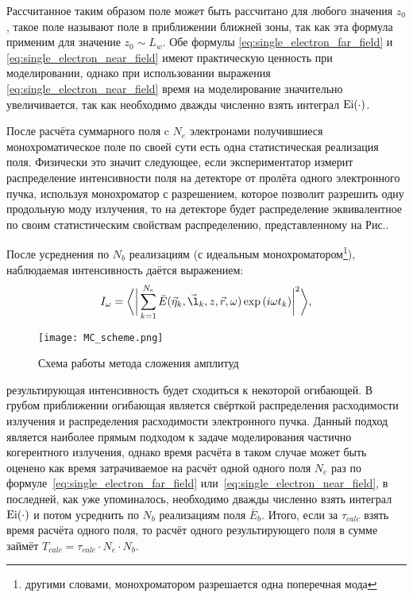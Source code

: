 Рассчитанное таким образом поле может быть рассчитано для любого значения $z_0$, такое поле называют поле в приближении ближней зоны, так как эта формула применим для значение $z_0 \sim L_w$. Обе формулы \ref{eq:single_electron_far_field} и \ref{eq:single_electron_near_field} имеют практическую ценность при моделировании, однако при использовании выражения \ref{eq:single_electron_near_field} время на моделирование значительно увеличивается, так как необходимо дважды численно взять интеграл $\textup{Ei}(\cdot)$.
 
После расчёта суммарного поля c $N_e$ электронами получившиеся монохроматическое поле по своей сути есть одна статистическая реализация поля.  Физически это значит следующее, если экспериментатор измерит распределение интенсивности поля на детекторе от пролёта одного электронного пучка, используя монохроматор с разрешением, которое позволит разрешить одну продольную моду излучения, то на детекторе будет распределение эквивалентное по своим статистическим свойствам распределению, представленному на Рис.. 

После усреднения по $N_b$ реализациям (с идеальным монохроматором\footnote{другими словами, монохроматором разрешается одна поперечная мода}), наблюдаемая интенсивность даётся выражением: 
\begin{align}
	I_{\omega} = \bigg \langle \bigg|\sum\limits_{k=1}^{N_e} \bar{E}(\vec{\eta}_k, \vec{\l}_k, z, \vec{r}, \omega) \exp{(i \omega t_k)}\bigg|^2 \bigg \rangle,
	\label{eq:I_MC} 
\end{align}
\begin{figure}[H] 
	\centering 	\texttt{[image: MC\_scheme.png]}
	\caption{Схема работы метода сложения амплитуд }
	\label{fig:SRW_scheme}
\end{figure}
\noindent результирующая интенсивность будет сходиться к некоторой огибающей. В грубом приближении огибающая является свёрткой распределения расходимости излучения и распределения расходимости электронного пучка. Данный подход является наиболее прямым подходом к задаче моделирования частично когерентного излучения, однако время расчёта в таком случае может быть оценено как время затрачиваемое на расчёт одной одного поля $N_e$ раз по формуле~\ref{eq:single_electron_far_field} или~\ref{eq:single_electron_near_field}, в последней, как уже упоминалось, необходимо дважды численно взять интеграл $\textup{Ei}(\cdot)$ и потом усреднить по $N_b$ реализациям поля $\bar{E}_{b}$. Итого, если за $\tau_{calc}$ взять время расчёта одного поля, то расчёт одного результирующего поля в сумме займёт $T_{calc} = \tau_{calc} \cdot N_e \cdot N_b$.

